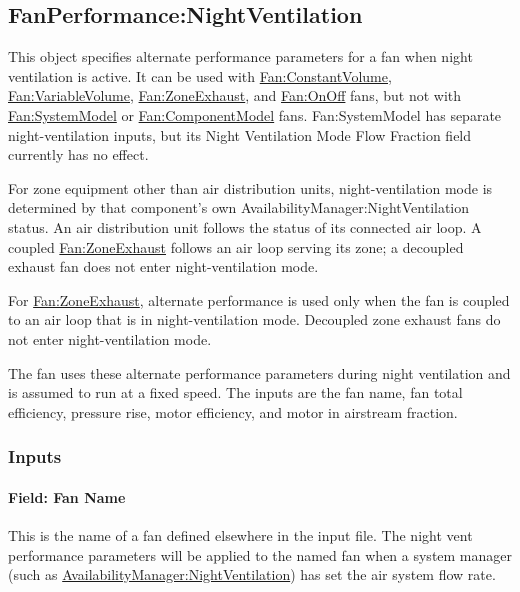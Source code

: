 \subsection{FanPerformance:NightVentilation}\label{fanperformancenightventilation}

This object specifies alternate performance parameters for a fan when night ventilation is active. It can be used with \hyperref[fanconstantvolume]{Fan:ConstantVolume}, \hyperref[fanvariablevolume]{Fan:VariableVolume}, \hyperref[fanzoneexhaust]{Fan:ZoneExhaust}, and \hyperref[fanonoff]{Fan:OnOff} fans, but not with \hyperref[fansystemmodel]{Fan:SystemModel} or \hyperref[fancomponentmodel]{Fan:ComponentModel} fans. Fan:SystemModel has separate night-ventilation inputs, but its Night Ventilation Mode Flow Fraction field currently has no effect.

For zone equipment other than air distribution units, night-ventilation mode is determined by that component's own AvailabilityManager:NightVentilation status. An air distribution unit follows the status of its connected air loop. A coupled \hyperref[fanzoneexhaust]{Fan:ZoneExhaust} follows an air loop serving its zone; a decoupled exhaust fan does not enter night-ventilation mode.

For \hyperref[fanzoneexhaust]{Fan:ZoneExhaust}, alternate performance is used only when the fan is coupled to an air loop that is in night-ventilation mode. Decoupled zone exhaust fans do not enter night-ventilation mode.

The fan uses these alternate performance parameters during night ventilation and is assumed to run at a fixed speed. The inputs are the fan name, fan total efficiency, pressure rise, motor efficiency, and motor in airstream fraction.

\subsubsection{Inputs}\label{inputs-4-013}

\paragraph{Field: Fan Name}\label{field-fan-name-001}

This is the name of a fan defined elsewhere in the input file. The night vent performance parameters will be applied to the named fan when a system manager (such as \hyperref[availabilitymanagernightventilation]{AvailabilityManager:NightVentilation}) has set the air system flow rate.


